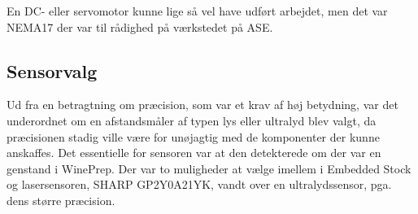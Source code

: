 En DC- eller servomotor kunne lige så vel have udført arbejdet, men det var NEMA17 der var til rådighed på værkstedet på ASE.

\subsection{Sensorvalg}
Ud fra en betragtning om præcision, som var et krav af høj betydning, var det underordnet om en afstandsmåler af typen lys eller ultralyd blev valgt, da præcisionen stadig ville være for unøjagtig med de komponenter der kunne anskaffes. Det essentielle for sensoren var at den detekterede om der var en genstand i WinePrep. Der var to muligheder at vælge imellem i Embedded Stock og lasersensoren, SHARP GP2Y0A21YK, vandt over en ultralydssensor, pga. dens større præcision.